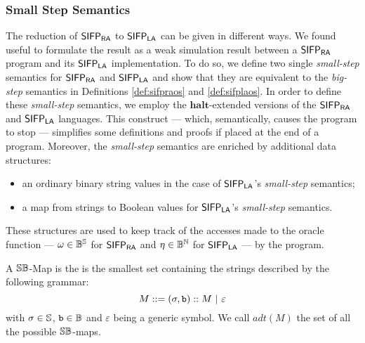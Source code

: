 \subsubsection{Small Step Semantics}
\label{subsub:smallstep}


The reduction of $\mathsf{SIFP_{{\mathsf{RA}}}}$ to $\mathsf{SIFP_{{\mathsf{LA}}}}$ can be given in different ways.
We found useful to formulate the result as a
weak simulation result between a $\mathsf{SIFP_{{\mathsf{RA}}}}$ program and its $\mathsf{SIFP_{{\mathsf{LA}}}}$
implementation.
%
To do so, we define two single \emph{small-step} semantics for $\mathsf{SIFP_{{\mathsf{RA}}}}$ and $\mathsf{SIFP_{{\mathsf{LA}}}}$
and show that they are equivalent to the \emph{big-step} semantics
in Definitions \ref{def:sifpraos} and \ref{def:sifplaos}.
%
In order to define these \emph{small-step} semantics,
we employ the $\mathbf{halt}$-extended versions of the $\mathsf{SIFP_{{\mathsf{RA}}}}$ and $\mathsf{SIFP_{{\mathsf{LA}}}}$ languages.
This construct --- which, semantically, causes the program to stop ---
simplifies some definitions and proofs if placed at the end of a program.
%
Moreover, the \emph{small-step} semantics are enriched by additional
data structures:

\begin{itemize}
  \item an ordinary binary string values in the case of $\mathsf{SIFP_{{\mathsf{LA}}}}$'s \emph{small-step} semantics;
  \item a map from strings to Boolean values for $\mathsf{SIFP_{{\mathsf{LA}}}}$'s \emph{small-step} semantics.
\end{itemize}

These structures are used to keep track of the accesses made to the oracle function ---
$\omega \in \mathbb{B}^{\mathbb{S}}$ for $\mathsf{SIFP_{{\mathsf{RA}}}}$ and $\eta \in \mathbb{B}^{\mathbb{N}}$ for $\mathsf{SIFP_{{\mathsf{LA}}}}$ ---
by the program.


\begin{defn}
  A $\mathbb{S}\mathbb{B}$-Map is the is the smallest set containing the strings described by the following grammar:
  $$
    M ::= (\sigma, \bool) :: M\ |\ \varepsilon
  $$
  with $\sigma\in \mathbb{S}$, $\mathtt{b} \in \mathbb{B}$ and $\varepsilon$ being a generic symbol.
  We call $\mathit{adt}(M)$ the set of all the possible $\mathbb{S}\mathbb{B}$-maps.
\end{defn}

